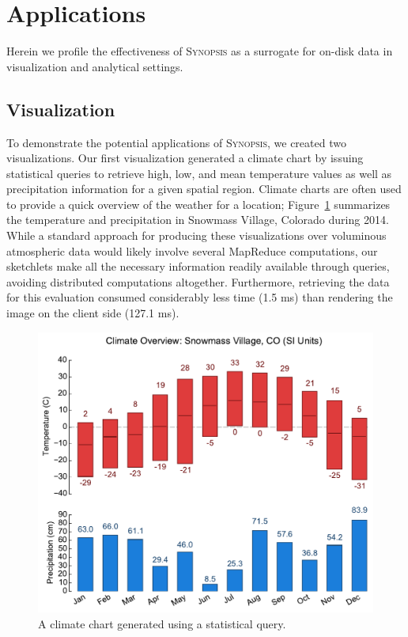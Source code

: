 \documentclass[9pt,journal,compsoc]{IEEEtran}
\begin{document}
\section{Applications}
\label{sec:applications}
Herein we profile the effectiveness of \textsc{Synopsis} as a surrogate for on-disk data in visualization and analytical settings.
\subsection{Visualization}
To demonstrate the potential applications of \textsc{Synopsis}, we created two visualizations. Our first visualization generated a climate chart by issuing statistical queries to retrieve high, low, and mean temperature values as well as precipitation information for a given spatial region. Climate charts are often used to provide a quick overview of the weather for a location; Figure~\ref{fig:climate} summarizes the temperature and precipitation in Snowmass Village, Colorado during 2014. While a standard approach for producing these visualizations over voluminous atmospheric data would likely involve several MapReduce computations, our sketchlets make all the necessary information readily available through queries, avoiding distributed computations altogether. Furthermore, retrieving the data for this evaluation consumed considerably less time (1.5 ms) than rendering the image on the client side (127.1 ms).
%
\begin{figure}[b]
    \centerline{\includegraphics[width=0.85\linewidth]{figures/climate-snowmass.pdf}}
    \caption{A climate chart generated using a statistical query.}
    \label{fig:climate}
\end{figure}
\end{document}
